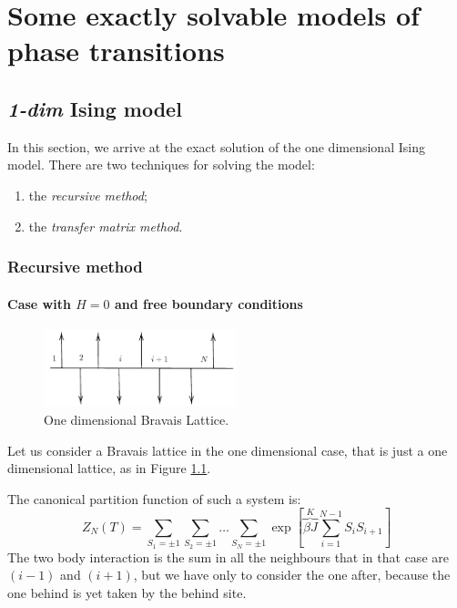 \documentclass[../../Main/Main.tex]{subfiles}
\begin{document}
\chapter{Some exactly solvable models of phase transitions}

\section{\emph{1-dim} Ising model}
In this section, we arrive at the exact solution of the one dimensional Ising model.
 There are two techniques for solving the model:
\begin{enumerate}
\item the \emph{recursive method};
\item the \emph{transfer matrix method}.
\end{enumerate}

\subsection{Recursive method}

\subsubsection{Case with \( H=0 \) and free boundary conditions}

\begin{figure}[h!]
\centering
\includegraphics[width=0.5\textwidth]{./img/2__1.pdf}
\caption{\label{fig:6_2} One dimensional Bravais Lattice.}
\end{figure}

Let us consider a Bravais lattice in the one dimensional case, that is just a one dimensional lattice, as in Figure \ref{fig:6_2}.

The canonical partition function of such a system is:
\begin{equation}
  Z_N (T) = \sum_{S_1 = \pm 1}^{} \sum_{S_2 = \pm 1}^{} \dots  \sum_{S_N = \pm 1}^{} \exp [
  \overbrace{ \beta J}^{K}  \sum_{i=1}^{N-1} S_i S_{i+1}  ]
\end{equation}
The two body interaction is the sum in all the neighbours that in that case are \( (i-1) \)  and \( (i+1) \), but we have only to consider the one after, because the one behind is yet taken by the behind site.
\end{document}
